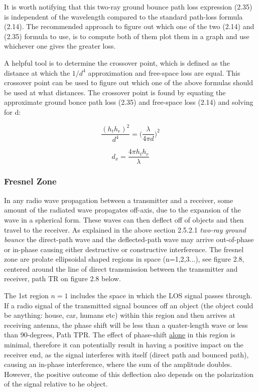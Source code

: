 It is worth notifying that this two-ray ground bounce path loss expression (2.35) is independent of the wavelength compared to the standard path-loss formula (2.14). The recommended approach to figure out which one of the two (2.14) and (2.35) formula to use, is to compute both of them plot them in a graph and use whichever one gives the greater loss. 

A helpful tool is to determine the crossover point, which is defined as the distance at which the $1/d^4$ approximation and free-space loss are equal. This crossover point can be used to figure out which one of the above formulas should be used at what distances. The crossover point is found by equating the approximate ground bonce path loss (2.35) and free-space loss (2.14) and solving for d:

$$\frac{(h_th_r)^2}{d^4}=\Big(\frac{\lambda}{4 \pi d}\Big)^2$$

\begin{equation}
  d_x= \frac{4\pi h_th_r}{\lambda}
\end{equation}

\subsubsection{Fresnel Zone}
In any radio wave propagation between a transmitter and a receiver, some amount of the radiated wave propagates off-axis, due to the expansion of the wave in a spherical form. These waves can then deflect off of objects and then travel to the receiver. As explained in the above section 2.5.2.1 \textit{two-ray ground bounce} the direct-path wave and the deflected-path wave may arrive out-of-phase or in-phase causing either destructive or constructive interference. The fresnel zone are prolate ellipsoidal shaped regions in space (n=1,2,3...), see figure 2.8, centered around the line of direct transmission between the transmitter and receiver, path TR on figure 2.8 below. 

The 1st region $n=1$ includes the space in which the LOS signal passes through. If a radio signal of the transmitted signal bounces off an object (the object could be anything: house, car, humans etc) within this region and then arrives at receiving antenna, the phase shift will be less than a quater-length wave or less than 90-degrees, Path TPR. The effect of phase-shift \underline{alone} in this region is minimal, therefore it can potentially result in having a positive impact on the receiver end, as the signal interferes with itself (direct path and bounced path), causing an in-phase interference, where the sum of the amplitude doubles. However, the positive outcome of this deflection also depends on the polarization of the signal relative to he object. %


